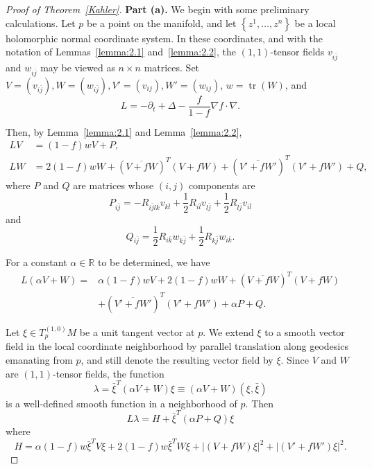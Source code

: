 \documentclass{amsart}
\theoremstyle{definition}
\theoremstyle{remark}
\numberwithin{equation}{section}
\begin{document}
\begin{proof}[Proof of Theorem~\ref{Kahler}]
  \textbf{Part (a).} We begin with some preliminary calculations. Let $p$ be a point on the manifold, and let $\left\{z^1, \ldots, z^n\right\}$ be a local holomorphic normal coordinate system. In these coordinates, and with the notation of Lemmas~\ref{lemma:2.1} and~\ref{lemma:2.2}, the $(1,1)$-tensor fields $v_{i \bar{j}}$ and
$w_{i \bar{j}}$ may be viewed as $n \times n$ matrices. Set $V=\left(v_{i \bar{j}}\right), W=\left(w_{i \bar{j}}\right), V'=\left(v_{i j}\right), W'=\left(w_{i j}\right)$, $w=\operatorname{tr}(W)$, and
  \[
  L=-\partial_t+\Delta-\frac{f}{1-f} \nabla f \cdot \nabla.
  \]
  
  Then, by Lemma~\ref{lemma:2.1} and Lemma~\ref{lemma:2.2},
  \begin{align}
  L V & = (1-f) w V+P, \\
  L W & =2(1-f) w W
    + (\overline{V + fW})^T(V + fW) + (\overline{V' + fW'})^T(V' + fW')
    +Q,
  \end{align}
  where $P$ and $Q$ are matrices whose $(i, j)$ components are
  \begin{equation}
      P_{i \bar{j}} = -R_{i \bar{j} l \bar{k}} v_{k \bar{l}}+\frac{1}{2} R_{i \bar{l}} v_{l\bar{j}}+\frac{1}{2} R_{l \bar{j}} v_{i \bar{l}}
  \end{equation}
  and
\begin{equation}
  Q_{i \bar{j}}=\frac{1}{2} R_{i \bar{k}} w_{k \bar{j}}+\frac{1}{2} R_{k \bar{j}} w_{i \bar{k}}.
\end{equation}

For a constant $\alpha \in \mathbb{R}$ to be determined, we have
\[
\begin{aligned}
  L(\alpha V+W)=&\alpha(1-f) w V+2(1-f) w W+
  (\overline{V + fW})^T(V + fW) \\
&+ (\overline{V' + fW'})^T(V' + fW')
+\alpha P+Q.
\end{aligned}
\]

Let $\xi \in T^{(1,0)}_p M$ be a unit tangent vector at $p$. We extend $\xi$ to a smooth vector field in the local coordinate neighborhood by parallel translation along geodesics emanating from $p$, and still denote the resulting vector field by $\xi$. Since $V$ and $W$ are $(1,1)$-tensor fields, the function
\[
\lambda=\bar{\xi}^T(\alpha V+W) \xi \equiv(\alpha V+W)(\xi,\bar {\xi})
\]
is a well-defined smooth function in a neighborhood of $p$. Then
\[
L \lambda=H+\bar{\xi}^T(\alpha P+Q) \xi
\]
where
\begin{equation}\label{def H}
  H=\alpha(1-f) w \bar{\xi}^T V \xi+2(1-f) w \bar{\xi}^T W \xi+|(V+f W) \xi|^2 + |(V'+f W') \xi|^2 .
\end{equation}


\end{proof}
\end{document}
